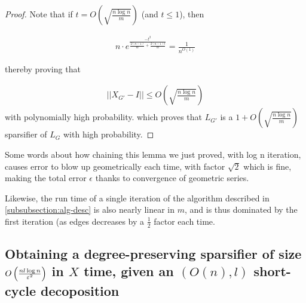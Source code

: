 \begin{proof}

      Note that if $t = O\left(\sqrt{\frac{n \log n}{m}}\right)$ (and $t \leq 1$), then 

      \begin{align}
      n \cdot e^{\frac{-t^2}{\frac{2(n-1)}{m} + \frac{2(n-1)t}{m}}}
      = \frac{1}{n^{O(1)}} 
      \end{align}


    thereby proving that 
      
      \begin{align}
      ||X_{G'} - I|| \leq O\left(\sqrt{\frac{n\log n}{m}}\right)
      \end{align}
        with polynomially high probability.
      which proves that $L_{G'}$ is a $1 + O\left(\sqrt{\frac{n\log n}{m}}\right)$
      sparsifier of $L_G$ with
      high probability.
    \end{proof}
    Some words about how chaining this lemma we just proved, with log n
    iteration, causes error to blow up geometrically each time, with factor
    $\sqrt{2}$ which is fine, 
    making the total error $\epsilon$ thanks to convergence of geometric series.

    Likewise, the run time of a single iteration of the algorithm described in
    \ref{subsubsection:alg-desc} is also nearly linear in $m$, and is thus
    dominated by the first iteration (as edges decreases by a $\frac{1}{2}$
    factor each time.

    \subsection{Obtaining a degree-preserving sparsifier of size 
    $O\left(\frac{nl \log n}{\varepsilon^2}\right)$ in $X$ time, given an
    $(O(n), l)$ short-cycle decoposition}


